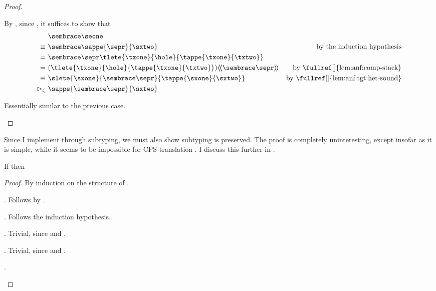 {\begin{proof}
\begin{proofcases}
      By , since
      \im{\anfh{\sfune{\sx}{\sA}{\seone}} =
        \tfune{\tx}{\anfh{\sA}}{\anfh{\seone}}}, it suffices to show that
      \im{\anfh{\seone} \equiv
        \sappe{\anfh{\sepr}}{\sxtwo}}
      \begin{align}
        & \anfh{\seone} \nonumber \\
        \equiv~& \anfh{\sappe{\sepr}{\sxtwo}} & \text{by the induction hypothesis} \\
        =~& \anf{\sepr}{\tlete{\txone}{\hole}{\tappe{\txone}{\txtwo}}} \\
        =~& (\tlete{\txone}{\hole}{\tappe{\txone}{\txtwo}})\hhw{\anfh{\sepr}} & \text{by \fullref[]{lem:anf:comp-stack}} \\
        \equiv~& \slete{\sxone}{\anfh{\sepr}}{\tappe{\sxone}{\sxtwo}} & \text{by \fullref[]{lem:anf:tgt:het-sound}} \\
        \step_{\zeta}~& \sappe{{\anfh{\sepr}}}{\sxtwo}
      \end{align}

    \item {} Essentially similar to the previous case. \qedhere
  \end{proofcases}
\end{proof}

Since I implement   through subtyping, we must
also show subtyping is preserved.
The proof is completely uninteresting, except insofar as it is simple, while it
seems to be impossible for CPS translation \cite{bowman2018:cps-sigma}.
I discuss this further in .
\begin{lemma}
  \label{lem:anf:subtype-pres}
  If \im{\ssubtyjudg{\slenv}{\se}{\sepr}} then \im{\ssubtyjudg{\anfh{\slenv}}{\anfh{\se}}{\anfh{\sepr}}}
\end{lemma}
\begin{proof}
  By induction on the structure of \im{\ssubtyjudg{\slenv}{\se}{\sepr}}.
  \begin{proofcases}
    \item {}. Follows by .
    \item {}. Follows the induction hypothesis.
    \item {}. Trivial, since \im{\anfh{\spropty} = \tpropty} and .
    \item {}. Trivial, since  and .
    \item {}.


\end{proofcases}
\end{proof}}
